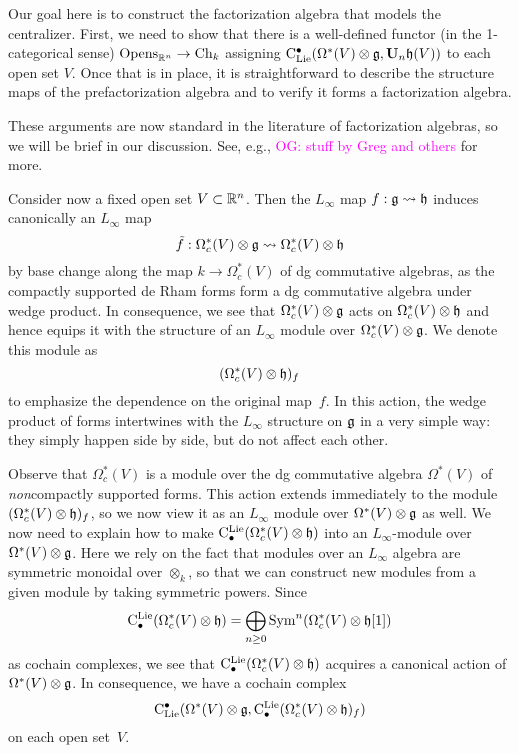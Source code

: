 \documentclass[11pt]{amsart}
\numberwithin{equation}{section}
\def\owen{\textcolor{magenta}{OG: }\textcolor{magenta}}
\begin{document}
Our goal here is to construct the factorization algebra that models the centralizer.
First, we need to show that there is a well-defined functor (in the 1-categorical sense) ${\rm Opens}_{\mathbb R^n} \to {\rm Ch}_k$ assigning ${\rm C}_{\rm Lie}^\bullet(\Omega^*(V) \otimes \mathfrak g, \mathbf U_n \mathfrak h(V))$ to each open set $V$.
Once that is in place, it is straightforward to describe the structure maps of the prefactorization algebra and to verify it forms a factorization algebra.

\begin{rmk}
These arguments are now standard in the literature of factorization algebras, so we will be brief in our discussion.
See, e.g., \cite{CG1} \owen{stuff by Greg and others} for more.
\end{rmk}

Consider now a fixed open set $V \subset \mathbb R^n$.
Then the $L_\infty$ map $f: \mathfrak g \rightsquigarrow \mathfrak h$ induces canonically an $L_\infty$ map 
\[
\tilde{f}: \Omega^*_c(V) \otimes \mathfrak g \rightsquigarrow \Omega^*_c(V) \otimes \mathfrak h
\]
by base change along the map $k \to \Omega^*_c(V)$ of dg commutative algebras,
as the compactly supported de Rham forms form a dg commutative algebra under wedge product.
In consequence, we see that $\Omega^*_c(V) \otimes \mathfrak g$ acts on $\Omega^*_c(V) \otimes \mathfrak h$ and hence equips it with the structure of an $L_\infty$ module over $\Omega^*_c(V) \otimes \mathfrak g$.
We denote this module as
\[
(\Omega^*_c(V) \otimes \mathfrak h)_f
\]
to emphasize the dependence on the original map~$f$.
In this action, the wedge product of forms intertwines with the $L_\infty$ structure on $\mathfrak g$ in a very simple way: 
they simply happen side by side, but do not affect each other.

Observe that $\Omega^*_c(V)$ is a module over the dg commutative algebra $\Omega^*(V)$ of {\em non}\/compactly supported forms.
This action extends immediately to the module $(\Omega^*_c(V) \otimes \mathfrak h)_f$, 
so we now view it as an $L_\infty$ module over $\Omega^*(V) \otimes \mathfrak g$ as well.
We now need to explain how to make ${\rm C}^{\rm Lie}_\bullet(\Omega^*_c(V) \otimes \mathfrak h)$ into an $L_\infty$-module over $\Omega^*(V) \otimes \mathfrak g$.
Here we rely on the fact that modules over an $L_\infty$ algebra are symmetric monoidal over $\otimes_k$, 
so that we can construct new modules from a given module by taking symmetric powers.
Since
\[
{\rm C}^{\rm Lie}_\bullet(\Omega^*_c(V) \otimes \mathfrak h) = \bigoplus_{n \geq 0} {\rm Sym}^n(\Omega^*_c(V) \otimes \mathfrak h[1])
\]
as cochain complexes,
we see that ${\rm C}^{\rm Lie}_\bullet(\Omega^*_c(V) \otimes \mathfrak h)$ acquires a canonical action of $\Omega^*(V) \otimes \mathfrak g$.
In consequence, we have a cochain complex
\[
{\rm C}_{\rm Lie}^\bullet(\Omega^*(V) \otimes \mathfrak g, {\rm C}^{\rm Lie}_\bullet(\Omega^*_c(V) \otimes \mathfrak h)_f)
\]
on each open set~$V$.
\end{document}
